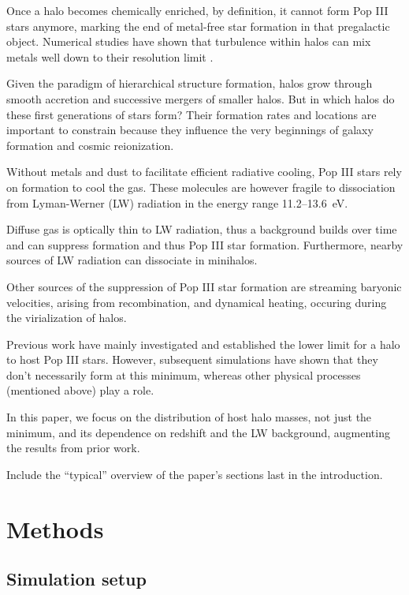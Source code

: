 \documentclass[a4paper,fleqn,usenatbib]{mnras}
\begin{document}
\li Once a halo becomes chemically enriched, by definition, it cannot
form Pop III stars anymore, marking the end of metal-free star
formation in that pregalactic object.  Numerical studies have shown
that turbulence within halos can mix metals well down to their
resolution limit \citep[][and more]{Wise08_Gal, Greif10}.

\li Given the paradigm of hierarchical structure formation, halos grow
through smooth accretion and successive mergers of smaller halos.  But
in which halos do these first generations of stars form?  Their
formation rates and locations are important to constrain because they
influence the very beginnings of galaxy formation and cosmic
reionization.

\li Without metals and dust to facilitate efficient radiative cooling,
Pop III stars rely on \hh{} formation to cool the gas.  These
molecules are however fragile to dissociation from Lyman-Werner
(LW) radiation in the energy range 11.2--13.6~eV.

\li Diffuse gas is optically thin to LW radiation, thus a background
builds over time and can suppress \hh{} formation and thus Pop III
star formation.  Furthermore, nearby sources of LW radiation can
dissociate \hh{} in minihalos.

\li Other sources of the suppression of Pop III star formation are
streaming baryonic velocities, arising from recombination, and
dynamical heating, occuring during the virialization of halos.

\li Previous work have mainly investigated and established the lower
limit for a halo to host Pop III stars.  However, subsequent
simulations have shown that they don't necessarily form at this
minimum, whereas other physical processes (mentioned above) play a
role.

\li In this paper, we focus on the distribution of host halo masses,
not just the minimum, and its dependence on redshift and the LW
background, augmenting the results from prior work.

\medskip
\noindent Include the ``typical'' overview of the paper's sections
last in the introduction.

\section{Methods}

\subsection{Simulation setup}
\end{document}
